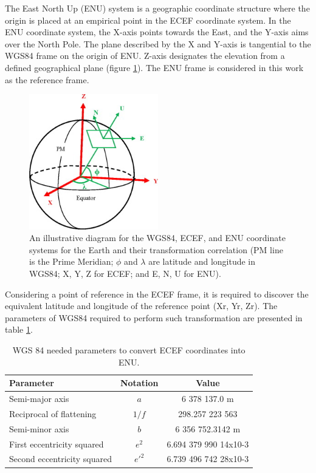 The East North Up (ENU) system is a geographic coordinate structure where the origin is placed at an empirical point in the ECEF coordinate system.  In the ENU coordinate system, the X-axis points towards the East, and the Y-axis aims over the North Pole. The plane described by the X and Y-axis is tangential to the WGS84 frame on the origin of ENU. Z-axis designates the elevation from a defined geographical plane (figure \ref{fig:ECEF}). The ENU frame is considered in this work as the reference frame.

\begin{figure}[H]
    \centering
    \includegraphics[width=0.5\textwidth]{figures/ECEF.jpg}
    \caption{An illustrative diagram for the WGS84, ECEF, and ENU coordinate systems for the Earth and their transformation correlation (PM line is the Prime Meridian; $\phi$ and $\lambda$ are latitude and longitude in WGS84; X, Y, Z for ECEF; and E, N, U for ENU).  }
    \label{fig:ECEF}
\end{figure}

Considering a point of reference in the ECEF frame, it is required to discover the equivalent latitude and longitude of the reference point (Xr, Yr, Zr). The parameters of WGS84 required to perform such transformation are presented in table \ref{tab:WGS}.

\begin{table}[H]
    \begin{center}
        \begin{tabular}[t]{lcc}
            \hline
            Parameter                   & Notation & Value                 \\
            \hline
            Semi-major axis             & $a$      & 6 378 137.0 m
            \\
            Reciprocal of flattening    & $1/f$    & 298.257 223 563
            \\
            Semi-minor axis             & $b$      & 6 356 752.3142 m      \\
            First eccentricity squared  & $e^2$    & 6.694 379 990 14x10-3 \\
            Second eccentricity squared & $e'^{2}$ & 6.739 496 742 28x10-3 \\
            \hline
        \end{tabular}
        \caption{WGS 84 needed parameters to convert ECEF coordinates into ENU. }
        \label{tab:WGS}
    \end{center}
\end{table}

